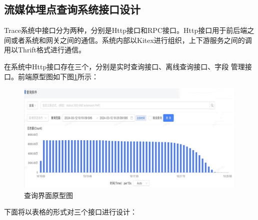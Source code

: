 \subsection{流媒体埋点查询系统接口设计}
Trace系统中接口分为两种，分别是Http接口和RPC接口。Http接口用于前后端之间或者系统和网关之间的通信。系统内部以Kitex进行组织，上下游服务之间的调用以Thrift格式进行通信。
   
在系统中Http接口存在三个，分别是实时查询接口、离线查询接口、字段
管理接口。前端原型图如下图\ref{chaxunyuanxing}所示：
\begin{figure}[htbp]
  \centering
  \includegraphics[scale=0.3]{figure/chapter4/查询界面原型图.jpg}
  \caption{查询界面原型图}\label{chaxunyuanxing}
\end{figure}

下面将以表格的形式对三个接口进行设计：

